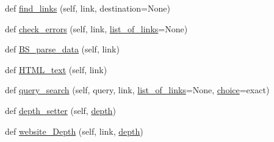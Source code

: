 \begin{DoxyCompactItemize}
def \hyperlink{classpylinkvalidator_1_1_p_o_c_01_code_1_1_web___crawler_1_1_web___crawler_a77d0c8f8dad271699c5c26a65c127767}{find\+\_\+links} (self, link, destination=None)
\item 
def \hyperlink{classpylinkvalidator_1_1_p_o_c_01_code_1_1_web___crawler_1_1_web___crawler_a2fc6c2e07ddf12c96da4216bc11763d5}{check\+\_\+errors} (self, link, \hyperlink{classpylinkvalidator_1_1_p_o_c_01_code_1_1_web___crawler_1_1_web___crawler_ac2956f25315755df07ef3ba47f283e83}{list\+\_\+of\+\_\+links}=None)
\item 
def \hyperlink{classpylinkvalidator_1_1_p_o_c_01_code_1_1_web___crawler_1_1_web___crawler_a09080daab7b16e68d2dbd4468079ae81}{B\+S\+\_\+parse\+\_\+data} (self, link)
\item 
def \hyperlink{classpylinkvalidator_1_1_p_o_c_01_code_1_1_web___crawler_1_1_web___crawler_a048a3be9f662196c8c355cb5f12c1cd8}{H\+T\+M\+L\+\_\+text} (self, link)
\item 
def \hyperlink{classpylinkvalidator_1_1_p_o_c_01_code_1_1_web___crawler_1_1_web___crawler_afac8f54efb9be45422268f8ccf9a5d48}{query\+\_\+search} (self, query, link, \hyperlink{classpylinkvalidator_1_1_p_o_c_01_code_1_1_web___crawler_1_1_web___crawler_ac2956f25315755df07ef3ba47f283e83}{list\+\_\+of\+\_\+links}=None, \hyperlink{classpylinkvalidator_1_1_p_o_c_01_code_1_1_web___crawler_1_1_web___crawler_a4100bfbd077cd54c5ee1b6e3ad21ba05}{choice}=\textquotesingle{}exact\textquotesingle{})
\item 
def \hyperlink{classpylinkvalidator_1_1_p_o_c_01_code_1_1_web___crawler_1_1_web___crawler_ac5547b7358459fc652278d1fd7306621}{depth\+\_\+setter} (self, \hyperlink{classpylinkvalidator_1_1_p_o_c_01_code_1_1_web___crawler_1_1_web___crawler_a4b25f5a1077981b4fc673a30cd6f60f5}{depth})
\item 
def \hyperlink{classpylinkvalidator_1_1_p_o_c_01_code_1_1_web___crawler_1_1_web___crawler_a0c6649825a52751d19cd23e093e2c6c3}{website\+\_\+\+Depth} (self, link, \hyperlink{classpylinkvalidator_1_1_p_o_c_01_code_1_1_web___crawler_1_1_web___crawler_a4b25f5a1077981b4fc673a30cd6f60f5}{depth})
\end{DoxyCompactItemize}
